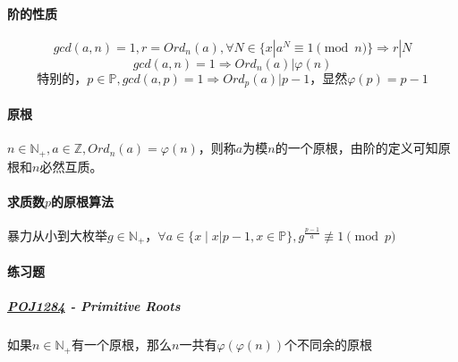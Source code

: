 \documentclass[]{cpp}
\begin{document}
\paragraph{阶的性质}
	$$gcd(a,n)=1,r=Ord_n(a),\forall N\in\{x|a^N\equiv1\pmod{n}\}\Rightarrow r|N$$
	$$gcd(a,n)=1\Rightarrow Ord_n(a)|\varphi(n)$$
	$$\mbox{特别的，}p\in\mathbb{P},gcd(a,p)=1\Rightarrow Ord_p(a)|p-1\mbox{，显然}\varphi(p)=p-1$$
\paragraph{原根} $n\in\mathbb{N_+},a\in\mathbb{Z},Ord_n(a)=\varphi(n)$，则称$a$为模$n$的一个原根，由阶的定义可知原根和$n$必然互质。
\paragraph{求质数$p$的原根算法}
	暴力从小到大枚举$g\in\mathbb{N_+}$，$\forall a\in\{x\;|\;x|p-1,x\in\mathbb{P}\},g^{\frac{p-1}{a}}\not\equiv1\pmod{p}$
\paragraph{练习题}
\subparagraph{\href{http://poj.org/problem?id=1284}{POJ1284} - Primitive Roots} 如果$n\in\mathbb{N_+}$有一个原根，那么$n$一共有$\varphi(\varphi(n))$个不同余的原根
\end{document}

